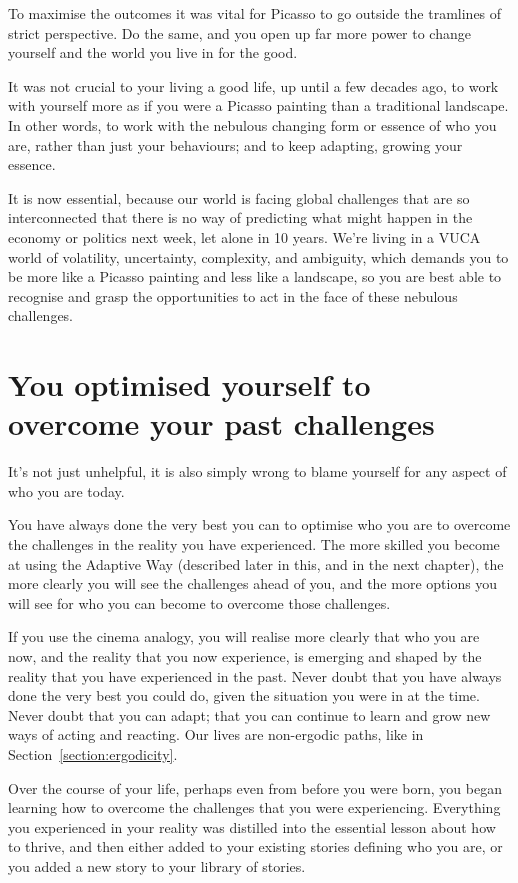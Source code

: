 To maximise the outcomes it was vital for Picasso to go outside the tramlines of strict perspective. Do the same, and you open up far more power to change yourself and the world you live in for the good.


It was not crucial to your living a good life, up until a few decades ago, to work with yourself more as if you were a Picasso painting than a traditional landscape. In other words, to work with the nebulous changing form or essence of who you are, rather than just your behaviours; and to keep adapting, growing your essence.


It is now essential, because our world is facing global challenges that are so interconnected that there is no way of predicting what might happen in the economy or politics next week, let alone in 10 years. We’re living in a VUCA  world of volatility, uncertainty, complexity, and ambiguity, which demands you to be more like a Picasso painting and less like a landscape, so you are best able to recognise and grasp the opportunities to act in the face of these nebulous challenges.
\section[You are optimised for past challenges]{You optimised yourself to overcome your past challenges}
\label{section:optimised-self}


It's not just unhelpful, it is also simply wrong to blame yourself for any aspect of who you are today. 


You have always done the very best you can to optimise who you are to overcome the challenges in the reality you have experienced. The more skilled you become at using the Adaptive Way (described later in this, and in the next chapter), the more clearly you will see the challenges ahead of you, and the more options you will see for who you can become to overcome those challenges.


If you use the cinema analogy, you will realise more clearly that who you are now, and the reality that you now experience, is emerging and shaped by the reality that you have experienced in the past. Never doubt that you have always done the very best you could do, given the situation you were in at the time. Never doubt that you can adapt; that you can continue to learn and grow new ways of acting and reacting. Our lives are non-ergodic paths, like in Section~\ref{section:ergodicity}.


Over the course of your life, perhaps even from before you were born, you began learning how to overcome the challenges that you were experiencing. Everything you experienced in your reality was distilled into the essential lesson about how to thrive, and then either added to your existing stories defining who you are, or you added a new story to your library of stories.


